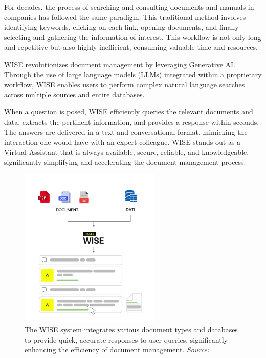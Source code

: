 For decades, the process of searching and consulting documents and manuals in companies has followed the same paradigm. This traditional method involves identifying keywords, clicking on each link, opening documents, and finally selecting and gathering the information of interest. This workflow is not only long and repetitive but also highly inefficient, consuming valuable time and resources.

WISE revolutionizes document management by leveraging Generative AI. Through the use of large language models (LLMs) integrated within a proprietary workflow, WISE enables users to perform complex natural language searches across multiple sources and entire databases. 

When a question is posed, WISE efficiently queries the relevant documents and data, extracts the pertinent information, and provides a response within seconds. The answers are delivered in a text and conversational format, mimicking the interaction one would have with an expert colleague. WISE stands out as a Virtual Assistant that is always available, secure, reliable, and knowledgeable, significantly simplifying and accelerating the document management process. \cite{hpa2024}

\begin{figure}[h!]
    \centering
    \includegraphics[width=0.6\textwidth]{images/wise/wise-schema-verticale.png}
    \caption{The WISE system integrates various document types and databases to provide quick, accurate responses to user queries, significantly enhancing the efficiency of document management. \textit{Source:} \cite{hpa2024}}
    \label{fig:wise-schema}
\end{figure}

